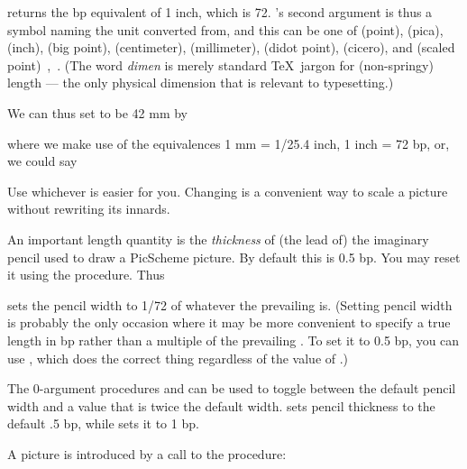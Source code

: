 
\n returns the bp equivalent of 1 inch, which is 72.
's second argument is thus a symbol naming the
unit converted from, and this can be one of 
(point),  (pica),  (inch),  (big
point),  (centimeter),  (millimeter),
 (didot point),  (cicero), and 
(scaled
point)~\cite[ch.~10]{tex},~\cite[ch.~11]{metafont}.
(The word {\em dimen} is merely standard \TeX\ jargon for
(non-springy) length --- the only physical dimension
that is relevant to typesetting.)

We can thus
set  to be 42 mm by


\n where we make use of the equivalences 1 mm = 1/25.4 inch,
1 inch = 72 bp, or, we could say


\n Use whichever is easier for you.  Changing
 is a convenient way to scale a
picture without rewriting its innards.


An important length quantity is
the {\em thickness} of (the lead of) the imaginary pencil used to
draw a PicScheme picture.  By default this is 0.5 bp.
You may reset it using the  procedure.
Thus


\n sets the pencil width to 1/72 of whatever the
prevailing  is.  (Setting pencil width is
probably the only occasion where it may be more
convenient to specify a true length in bp rather than a
multiple of the prevailing .  To set
it to 0.5 bp, you can use
,
which does the correct thing regardless of the value of
.)


The 0-argument procedures
 and  can be used to toggle between
the default pencil width and a value that is twice the
default width.
 sets pencil
thickness to the default .5 bp, while
 sets it to 1 bp.


A picture is introduced by a call to the
 procedure:

